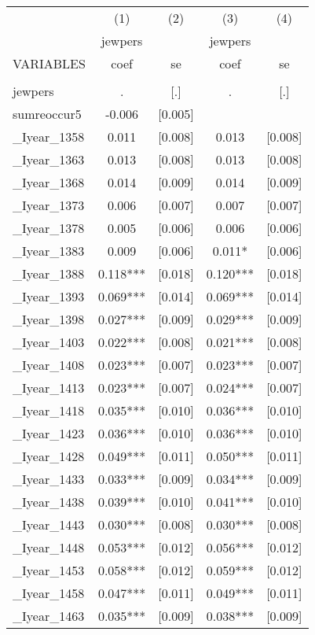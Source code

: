 \documentclass[landscape]{article}
\begin{document}
\begin{tabular}{lcccc} \hline
 & (1) & (2) & (3) & (4) \\
 & jewpers &  & jewpers &  \\
VARIABLES & coef & se & coef & se \\ \hline
 &  &  &  &  \\
jewpers & . & [.] & . & [.] \\
sumreoccur5 & -0.006 & [0.005] &  &  \\
\_Iyear\_1358 & 0.011 & [0.008] & 0.013 & [0.008] \\
\_Iyear\_1363 & 0.013 & [0.008] & 0.013 & [0.008] \\
\_Iyear\_1368 & 0.014 & [0.009] & 0.014 & [0.009] \\
\_Iyear\_1373 & 0.006 & [0.007] & 0.007 & [0.007] \\
\_Iyear\_1378 & 0.005 & [0.006] & 0.006 & [0.006] \\
\_Iyear\_1383 & 0.009 & [0.006] & 0.011* & [0.006] \\
\_Iyear\_1388 & 0.118*** & [0.018] & 0.120*** & [0.018] \\
\_Iyear\_1393 & 0.069*** & [0.014] & 0.069*** & [0.014] \\
\_Iyear\_1398 & 0.027*** & [0.009] & 0.029*** & [0.009] \\
\_Iyear\_1403 & 0.022*** & [0.008] & 0.021*** & [0.008] \\
\_Iyear\_1408 & 0.023*** & [0.007] & 0.023*** & [0.007] \\
\_Iyear\_1413 & 0.023*** & [0.007] & 0.024*** & [0.007] \\
\_Iyear\_1418 & 0.035*** & [0.010] & 0.036*** & [0.010] \\
\_Iyear\_1423 & 0.036*** & [0.010] & 0.036*** & [0.010] \\
\_Iyear\_1428 & 0.049*** & [0.011] & 0.050*** & [0.011] \\
\_Iyear\_1433 & 0.033*** & [0.009] & 0.034*** & [0.009] \\
\_Iyear\_1438 & 0.039*** & [0.010] & 0.041*** & [0.010] \\
\_Iyear\_1443 & 0.030*** & [0.008] & 0.030*** & [0.008] \\
\_Iyear\_1448 & 0.053*** & [0.012] & 0.056*** & [0.012] \\
\_Iyear\_1453 & 0.058*** & [0.012] & 0.059*** & [0.012] \\
\_Iyear\_1458 & 0.047*** & [0.011] & 0.049*** & [0.011] \\
\_Iyear\_1463 & 0.035*** & [0.009] & 0.038*** & [0.009] \\

\end{tabular}
\end{document}
